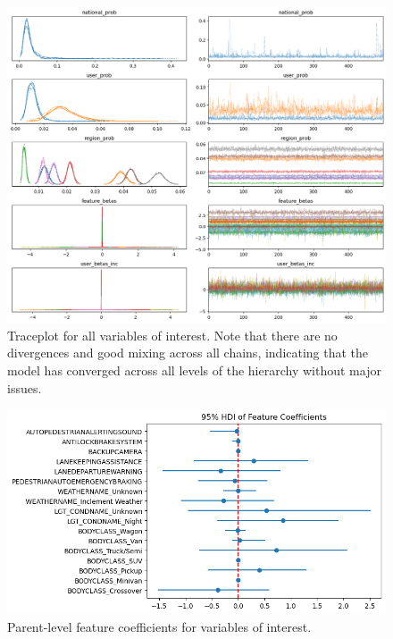 \documentclass[12pt]{article}
\begin{document}
\begin{figure}[h]
    \centering
    \includegraphics[width=\textwidth]{images/traceplot.png}
    \caption{Traceplot for all variables of interest. Note that there are no divergences and good mixing across all
        chains, indicating that the model has converged across all levels of the hierarchy without major issues.}
    \label{fig:traceplot}
\end{figure}



\begin{figure}[h]
    \centering
    \includegraphics[width=\textwidth]{images/all_users_coefficients.png}
    \caption{Parent-level feature coefficients for variables of interest.}
    \label{fig:all_users}
\end{figure}
\end{document}
